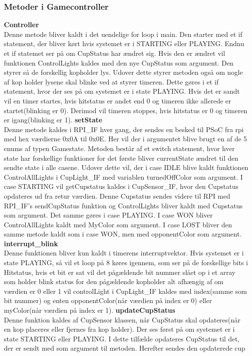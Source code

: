 \documentclass[Softwaredesign/Softwaredesign_main.tex]{subfiles}
\begin{document}
\subsubsection{Metoder i Gamecontroller}
\textbf{Controller}\\
Denne metode bliver kaldt i det uendelige for loop i main. Den starter med et if statement, der bliver kørt hvis systemet er i STARTING eller PLAYING. Endnu et if statemet ser på om CupStatus har ændret sig. Hvis den er ændret vil funktionen ControlLights kaldes med den nye CupStatus som argument. Den styrer så de forskellig kopholder lys. Udover dette styrer metoden også om nogle af kop holder lysene skal blinke ved at styrer timeren. Dette gøres i et if statement, hvor der ses på om systemet er i state PLAYING. Hvis det er sandt vil en timer startes, hvis hitstatus er andet end 0 og timeren ikke allerede er startet(blinking er 0). Derimod vil timeren stoppes, hvis hitstatus er 0 og timeren er igang(blinking er 1).
\textbf{setState}\\
Denne metode kaldes i RPI\_IF hver gang, der sendes en besked til PSoC fra rpi med hex værdierne 0x0A til 0x0E. Her vil der i argumentet blive brugt en af de 5 enums af typen Gamestate. Metoden består af et switch statement, hvor hver state har forskellige funktioner for det første bliver currentState ændret til den sendte state i alle casene. Udover dette vil, der i case IDLE blive kaldt funktionen ControlAllLights i CupLight\_IF med variablen turnedOffColor som argument. I case STARTING vil getCupstatus kaldes i CupSensor\_IF, hvor den Cupstatus opdateres ud fra retur værdien. Denne Cupstatus sendes videre til RPI med RPI\_IF's sendCupStatus funktion og ControlLights bliver kaldt med Cupstatus som argument. Det samme gøres i case PLAYING. I case WON bliver ControlAllLights kaldt med MyColor som argument. I case LOST bliver den samme metode kaldt som i case WON, men med opponentColor som argument.
\textbf{interrupt\_blink}\\
Denne funktionen bliver kun kaldt i timerens interruptvektor. Hvis systemet er i state PLAYING, så vil et loop på 8 køres igennem, som ser på de forskellige bits i Hitstatus, hvis et bit er sat vil det pågældende bit nummer slået op i et array som holder blink status for den pågældende kopholder alt afhængig af om værdien er 0 eller 1 vil controlLight i CupLight\_IF kaldes med index(samme som bit nummer) og enten opponentColor(når værdien på index er 0) eller myColor(når værdien på index er 1).
\textbf{updateCupStatus}\\
Denne funktion kaldes af CupSensor klassen, når CupStatus skal opdateres(når en kop placeres eller fjernes fra kop holder). Der ses først på om systemet er i state STARTING eller PLAYING. I dette tilfælde opdateres CupStatus til det, der er sendt med som argument til metoden. Herefter sendes den opdaterede cup 
\end{document}
